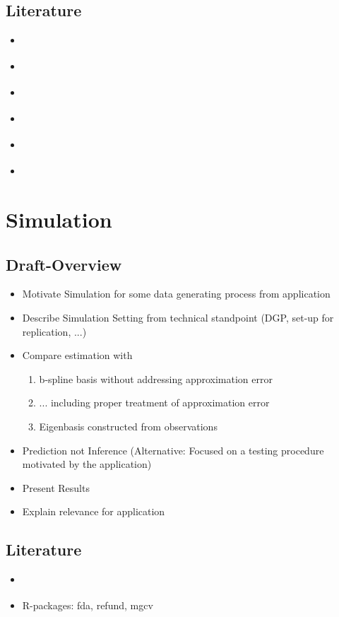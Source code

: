 \documentclass[11pt,twoside,a4paper]{article}
\begin{document}
	\subsection{Literature}
	\begin{itemize}
		\item \cite{kokoszka_introduction_2017}
		\item \cite{hsing_theoretical_2015}
		\item \cite{ramsay_functional_2005}
		\item \cite{horvath_inference_2012}
		\item \cite{cai_prediction_2006}
		\item \cite{levitin_introduction_2007}
	\end{itemize}
	
	\newpage
	\section{Simulation}
	
	\subsection{Draft-Overview}
	\begin{itemize}
		\item Motivate Simulation for some data generating process from application
		\item Describe Simulation Setting from technical standpoint (DGP, set-up for replication, ...)
		
		\item Compare estimation with \begin{enumerate}
			\item b-spline basis without addressing approximation error
			\item ... including proper treatment of approximation error
			\item Eigenbasis constructed from observations
			\end{enumerate}
	
		\item Prediction not Inference (Alternative: Focused on a testing procedure motivated by the application)
		\item Present Results
		\item Explain relevance for application
	\end{itemize}

	\subsection{Literature}
	\begin{itemize}
		\item \cite{shonkwiler_explorations_2009}
		\item R-packages: fda, refund, mgcv
	\end{itemize}
	
\end{document}
